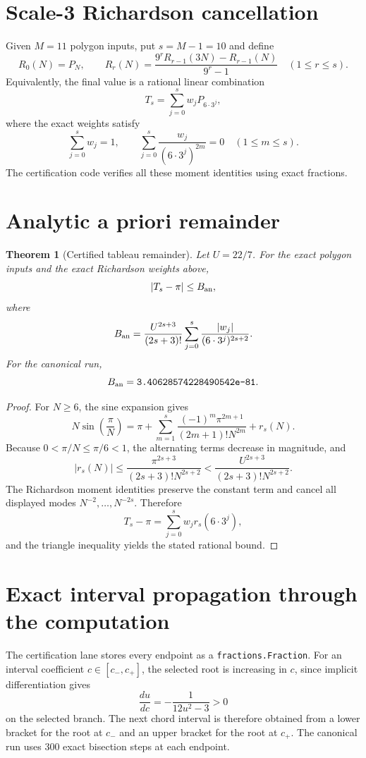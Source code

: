 \documentclass[11pt]{article}
\newtheorem{theorem}{Theorem}
\begin{document}
\section{Scale-3 Richardson cancellation}

Given $M=11$ polygon inputs, put $s=M-1=10$ and define
\[
 R_0(N)=P_N,
 \qquad
 R_r(N)=\frac{9^rR_{r-1}(3N)-R_{r-1}(N)}{9^r-1}
 \quad (1\le r\le s).
\]
Equivalently, the final value is a rational linear combination
\[
 T_s=\sum_{j=0}^s w_jP_{6\cdot3^j},
\]
where the exact weights satisfy
\[
 \sum_{j=0}^s w_j=1,
 \qquad
 \sum_{j=0}^s \frac{w_j}{(6\cdot3^j)^{2m}}=0
 \quad (1\le m\le s).
\]
The certification code verifies all these moment identities using exact fractions.

\section{Analytic a priori remainder}

\begin{theorem}[Certified tableau remainder]
Let $U=22/7$.  For the exact polygon inputs and the exact Richardson weights above,
\[
 |T_s-\pi|\le B_{\rm an},
\]
where
\[
 B_{\rm an}
 =\frac{U^{2s+3}}{(2s+3)!}
  \sum_{j=0}^s
  \frac{|w_j|}{(6\cdot3^j)^{2s+2}}.
\]
For the canonical run,
\[
 B_{\rm an}=\texttt{3.40628574228490542e-81}.
\]
\end{theorem}

\begin{proof}
For $N\ge6$, the sine expansion gives
\[
 N\sin\!\left(\frac\pi N\right)
 =\pi+\sum_{m=1}^s
 \frac{(-1)^m\pi^{2m+1}}{(2m+1)!N^{2m}}+r_s(N).
\]
Because $0<\pi/N\le\pi/6<1$, the alternating terms decrease in magnitude, and
\[
 |r_s(N)|\le
 \frac{\pi^{2s+3}}{(2s+3)!N^{2s+2}}
 <\frac{U^{2s+3}}{(2s+3)!N^{2s+2}}.
\]
The Richardson moment identities preserve the constant term and cancel all displayed modes $N^{-2},\ldots,N^{-2s}$.  Therefore
\[
 T_s-\pi=\sum_{j=0}^s w_jr_s(6\cdot3^j),
\]
and the triangle inequality yields the stated rational bound.
\end{proof}

\section{Exact interval propagation through the computation}

The certification lane stores every endpoint as a \texttt{fractions.Fraction}.  For an interval coefficient $c\in[c_-,c_+]$, the selected root is increasing in $c$, since implicit differentiation gives
\[
 \frac{du}{dc}=-\frac1{12u^2-3}>0
\]
on the selected branch.  The next chord interval is therefore obtained from a lower bracket for the root at $c_-$ and an upper bracket for the root at $c_+$.  The canonical run uses 300 exact bisection steps at each endpoint.
\end{document}
